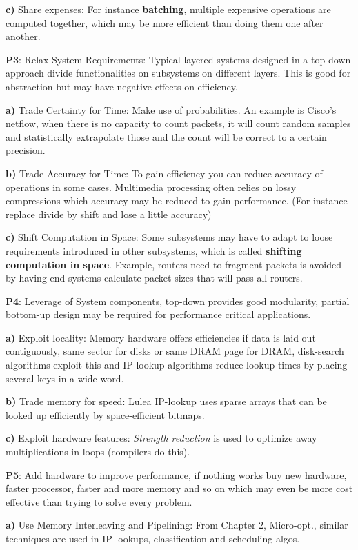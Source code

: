 \textbf{c)} Share expenses: For instance \textbf{batching}, multiple expensive operations are computed together, which may be more efficient than doing them one after another.

\textbf{P3}: Relax System Requirements: Typical layered systems designed in a top-down approach divide functionalities on subsystems on different layers. This is good for abstraction but may have negative effects on efficiency.

\textbf{a)} Trade Certainty for Time: Make use of probabilities. An example is Cisco's netflow, when there is no capacity to count packets, it will count random samples and statistically extrapolate those and the count will be correct to a certain precision.

\textbf{b)} Trade Accuracy for Time: To gain efficiency you can reduce accuracy of operations in some cases. Multimedia processing often relies on lossy compressions which accuracy may be reduced to gain performance. (For instance replace divide by shift and lose a little accuracy)

\textbf{c)} Shift Computation in Space: Some subsystems may have to adapt to loose requirements introduced in other subsystems, which is called \textbf{shifting computation in space}. Example, routers need to fragment packets is avoided by having end systems calculate packet sizes that will pass all routers.

\textbf{P4}: Leverage of System components, top-down provides good modularity, partial bottom-up design may be required for performance critical applications.

\textbf{a)} Exploit locality: Memory hardware offers efficiencies if data is laid out contiguously, same sector for disks or same DRAM page for DRAM, disk-search algorithms exploit this and IP-lookup algorithms reduce lookup times by placing several keys in a wide word.

\textbf{b)} Trade memory for speed: Lulea IP-lookup uses sparse arrays that can be looked up efficiently by space-efficient bitmaps.

\textbf{c)} Exploit hardware features: \textit{Strength reduction} is used to optimize away multiplications in loops (compilers do this).

\textbf{P5}: Add hardware to improve performance, if nothing works buy new hardware, faster processor, faster and more memory and so on which may even be more cost effective than trying to solve every problem.

\textbf{a)} Use Memory Interleaving and Pipelining: From Chapter 2, Micro-opt., similar techniques are used in IP-lookups, classification and scheduling algos. 

